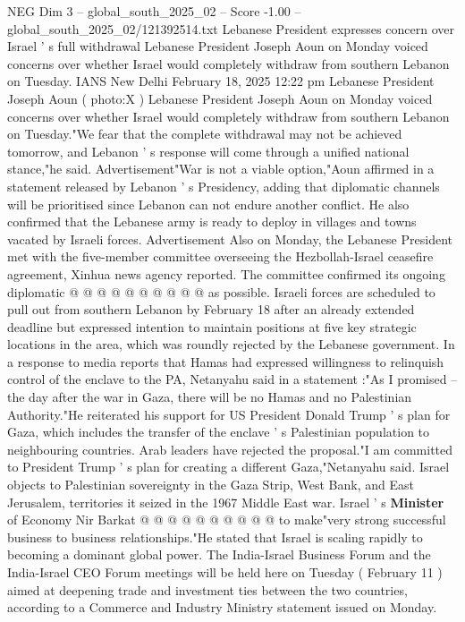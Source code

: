 \begin{textsample}{NEG Dim 3 – global\_south\_2025\_02 – Score -1.00 – global\_south\_2025\_02/121392514.txt}  \label{ex:f3_neg_015}
Lebanese President expresses concern over Israel ' s full withdrawal Lebanese President Joseph Aoun on Monday voiced concerns over whether Israel would completely withdraw from southern Lebanon on Tuesday.
IANS New Delhi February 18, 2025 12:22 pm Lebanese President Joseph Aoun ( photo:X ) Lebanese President Joseph Aoun on Monday voiced concerns over whether Israel would completely withdraw from southern Lebanon on Tuesday."We fear that the complete withdrawal may not be achieved tomorrow, and Lebanon ' s response will come through a unified national stance,"he said.
Advertisement"War is not a viable option,"Aoun affirmed in a statement released by Lebanon ' s Presidency, adding that diplomatic channels will be prioritised since Lebanon can not endure another conflict.
He also confirmed that the Lebanese army is ready to deploy in villages and towns vacated by Israeli forces.
Advertisement Also on Monday, the Lebanese President met with the five-member committee overseeing the Hezbollah-Israel ceasefire agreement, Xinhua news agency reported.
The committee confirmed its ongoing diplomatic @ @ @ @ @ @ @ @ @ @ as possible.
Israeli forces are scheduled to pull out from southern Lebanon by February 18 after an already extended deadline but expressed intention to maintain positions at five key strategic locations in the area, which was roundly rejected by the Lebanese government.
In a response to media reports that Hamas had expressed willingness to relinquish control of the enclave to the PA, Netanyahu said in a statement :"As I promised -- the day after the war in Gaza, there will be no Hamas and no Palestinian Authority."He reiterated his support for US President Donald Trump ' s plan for Gaza, which includes the transfer of the enclave ' s Palestinian population to neighbouring countries.
Arab leaders have rejected the proposal."I am committed to President Trump ' s plan for creating a different Gaza,"Netanyahu said.
Israel objects to Palestinian sovereignty in the Gaza Strip, West Bank, and East Jerusalem, territories it seized in the 1967 Middle East war.
Israel ' s \textbf{Minister} of Economy Nir Barkat @ @ @ @ @ @ @ @ @ @ to make"very strong successful business to business relationships."He stated that Israel is scaling rapidly to becoming a dominant global power.
The India-Israel Business Forum and the India-Israel CEO Forum meetings will be held here on Tuesday ( February 11 ) aimed at deepening trade and investment ties between the two countries, according to a Commerce and Industry Ministry statement issued on Monday.

\end{textsample}
